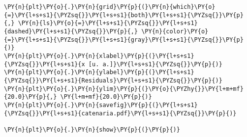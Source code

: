 \begin{Verbatim}[label=\makebox{\href{https://github.com/unipi-physics-labs/lab1-sheets/tree/main/snippy/dad_catenaria.py}{https://github.com/.../dad\_catenaria.py}},commandchars=\\\{\}]
\PY{n}{plt}\PY{o}{.}\PY{n}{grid}\PY{p}{(}\PY{n}{which}\PY{o}{=}\PY{l+s+s1}{\PYZsq{}}\PY{l+s+s1}{both}\PY{l+s+s1}{\PYZsq{}}\PY{p}{,} \PY{n}{ls}\PY{o}{=}\PY{l+s+s1}{\PYZsq{}}\PY{l+s+s1}{dashed}\PY{l+s+s1}{\PYZsq{}}\PY{p}{,} \PY{n}{color}\PY{o}{=}\PY{l+s+s1}{\PYZsq{}}\PY{l+s+s1}{gray}\PY{l+s+s1}{\PYZsq{}}\PY{p}{)}
\PY{n}{plt}\PY{o}{.}\PY{n}{xlabel}\PY{p}{(}\PY{l+s+s1}{\PYZsq{}}\PY{l+s+s1}{x [u. a.]}\PY{l+s+s1}{\PYZsq{}}\PY{p}{)}
\PY{n}{plt}\PY{o}{.}\PY{n}{ylabel}\PY{p}{(}\PY{l+s+s1}{\PYZsq{}}\PY{l+s+s1}{Residuals}\PY{l+s+s1}{\PYZsq{}}\PY{p}{)}
\PY{n}{plt}\PY{o}{.}\PY{n}{ylim}\PY{p}{(}\PY{o}{\PYZhy{}}\PY{l+m+mf}{20.0}\PY{p}{,} \PY{l+m+mf}{20.0}\PY{p}{)}
\PY{n}{plt}\PY{o}{.}\PY{n}{savefig}\PY{p}{(}\PY{l+s+s1}{\PYZsq{}}\PY{l+s+s1}{catenaria.pdf}\PY{l+s+s1}{\PYZsq{}}\PY{p}{)}

\PY{n}{plt}\PY{o}{.}\PY{n}{show}\PY{p}{(}\PY{p}{)}
\end{Verbatim}

